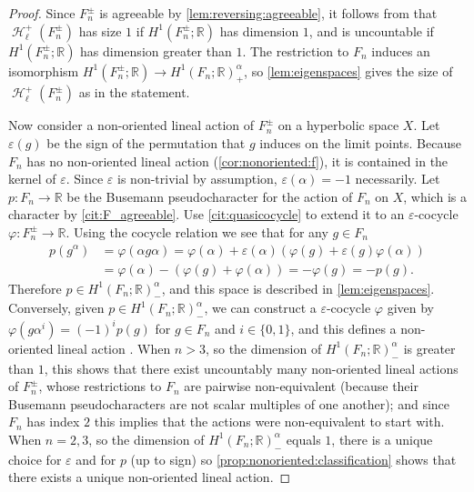 \documentclass[reqno,12pt]{amsart}\setcounter{tocdepth}{1}
\theoremstyle{definition}
\newcommand{\R}{\mathbb{R}}
\DeclareMathOperator{\Hyp}{\mathcal{H}}
\numberwithin{equation}{section}
\begin{document}
\begin{proof}
Since $F_n^{\pm}$ is agreeable by \cref{lem:reversing:agreeable}, it follows from \cite[Theorem 4.22]{ABO} that $\Hyp_\ell^+(F_n^\pm)$ has size $1$ if $H^1(F_n^\pm; \R)$ has dimension $1$, and is uncountable if $H^1(F_n^\pm; \R)$ has dimension greater than $1$. The restriction to $F_n$ induces an isomorphism $H^1(F_n^\pm; \R) \to H^1(F_n; \R)^{\alpha}_+$, so \cref{lem:eigenspaces} gives the size of $\Hyp_\ell^+(F_n^\pm)$ as in the statement.

Now consider a non-oriented lineal action of $F_n^{\pm}$ on a hyperbolic space $X$. Let $\varepsilon(g)$ be the sign of the permutation that $g$ induces on the limit points. Because $F_n$ has no non-oriented lineal action (\cref{cor:nonoriented:f}), it is contained in the kernel of $\varepsilon$. Since $\varepsilon$ is non-trivial by assumption, $\varepsilon(\alpha) = -1$ necessarily. Let $p \colon F_n \to \R$ be the Busemann pseudocharacter for the action of $F_n$ on $X$, which is a character by \cref{cit:F_agreeable}. Use \cref{cit:quasicocycle} to extend it to an $\varepsilon$-cocycle $\varphi \colon F_n^{\pm} \to \R$. Using the cocycle relation we see that for any $g \in F_n$
\begin{align*}
    p(g^\alpha) &= \varphi(\alpha g \alpha) = \varphi(\alpha) + \varepsilon(\alpha) (\varphi(g) + \varepsilon(g) \varphi(\alpha)) \\
    &= \varphi(\alpha) - (\varphi(g) + \varphi(\alpha)) = -\varphi(g) = -p(g).
\end{align*}
Therefore $p \in H^1(F_n; \R)^\alpha_-$, and this space is described in \cref{lem:eigenspaces}. Conversely, given $p \in H^1(F_n; \R)^\alpha_-$, we can construct a $\varepsilon$-cocycle $\varphi$ given by $\varphi(g \alpha^i) = (-1)^i p(g)$ for $g \in F_n$ and $i \in \{0, 1\}$, and this defines a non-oriented lineal action \cite[Lemma 2.14]{NL}. When $n > 3$, so the dimension of $H^1(F_n; \R)^\alpha_-$ is greater than $1$, this shows that there exist uncountably many non-oriented lineal actions of $F_n^{\pm}$, whose restrictions to $F_n$ are pairwise non-equivalent (because their Busemann pseudocharacters are not scalar multiples of one another); and since $F_n$ has index $2$ this implies that the actions were non-equivalent to start with. When $n = 2,3$, so the dimension of $H^1(F_n; \R)^\alpha_-$ equals $1$, there is a unique choice for $\varepsilon$ and for $p$ (up to sign) so \cref{prop:nonoriented:classification} shows that there exists a unique non-oriented lineal action.
\end{proof}
\end{document}
